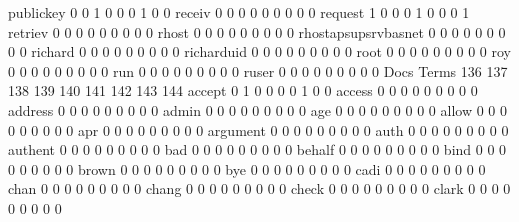 \documentclass[compress,8pt]{beamer}
\begin{document}
\begin{frame}
\begin{Schunk}
  publickey                                  0   0   1   0   0   0   1   0   0
  receiv                                     0   0   0   0   0   0   0   0   0
  request                                    1   0   0   0   1   0   0   0   1
  retriev                                    0   0   0   0   0   0   0   0   0
  rhost                                      0   0   0   0   0   0   0   0   0
  rhostapsupsrvbasnet                        0   0   0   0   0   0   0   0   0
  richard                                    0   0   0   0   0   0   0   0   0
  richarduid                                 0   0   0   0   0   0   0   0   0
  root                                       0   0   0   0   0   0   0   0   0
  roy                                        0   0   0   0   0   0   0   0   0
  run                                        0   0   0   0   0   0   0   0   0
  ruser                                      0   0   0   0   0   0   0   0   0
                                          Docs
Terms                                      136 137 138 139 140 141 142 143 144
  accept                                     0   1   0   0   0   0   1   0   0
  access                                     0   0   0   0   0   0   0   0   0
  address                                    0   0   0   0   0   0   0   0   0
  admin                                      0   0   0   0   0   0   0   0   0
  age                                        0   0   0   0   0   0   0   0   0
  allow                                      0   0   0   0   0   0   0   0   0
  apr                                        0   0   0   0   0   0   0   0   0
  argument                                   0   0   0   0   0   0   0   0   0
  auth                                       0   0   0   0   0   0   0   0   0
  authent                                    0   0   0   0   0   0   0   0   0
  bad                                        0   0   0   0   0   0   0   0   0
  behalf                                     0   0   0   0   0   0   0   0   0
  bind                                       0   0   0   0   0   0   0   0   0
  brown                                      0   0   0   0   0   0   0   0   0
  bye                                        0   0   0   0   0   0   0   0   0
  cadi                                       0   0   0   0   0   0   0   0   0
  chan                                       0   0   0   0   0   0   0   0   0
  chang                                      0   0   0   0   0   0   0   0   0
  check                                      0   0   0   0   0   0   0   0   0
  clark                                      0   0   0   0   0   0   0   0   0

\end{Schunk}
\end{frame}
\end{document}
